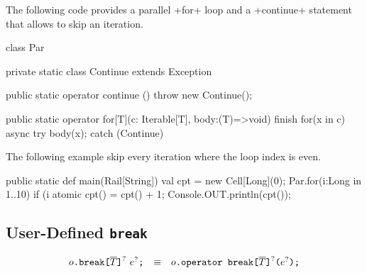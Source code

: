 \begin{ex}
  The following code provides a parallel \xcd+for+ loop and a
  \xcd+continue+ statement that allows to skip an iteration.
\begin{xten}
class Par {
  private static class Continue extends Exception {}

  public static operator continue () {
    throw new Continue();
  }

  public static operator for[T](c: Iterable[T], body:(T)=>void) {
    finish {
      for(x in c) async {
          try {
            body(x);
          } catch (Continue) {}
        }
    }
  }
}
\end{xten}
%
  The following example skip every iteration where the loop index is
  even.
\begin{xten}
public static def main(Rail[String]) {
  val cpt = new Cell[Long](0);
  Par.for(i:Long in 1..10) {
    if (i%
    atomic { cpt() = cpt() + 1; }
  }
  Console.OUT.println(cpt());
}
\end{xten}
\end{ex}


\subsection{User-Defined \texttt{break}}

$$
\begin{array}{rcl}
  {o}\texttt{.break}\texttt{[}{\overline{T}}\texttt{]}^?~{e}^?\texttt{;}
  & \equiv &
  {o}\texttt{.operator break}\texttt{[}{\overline{T}}\texttt{]}^?\texttt{(}{e}^?\texttt{);}
\end{array}
$$

